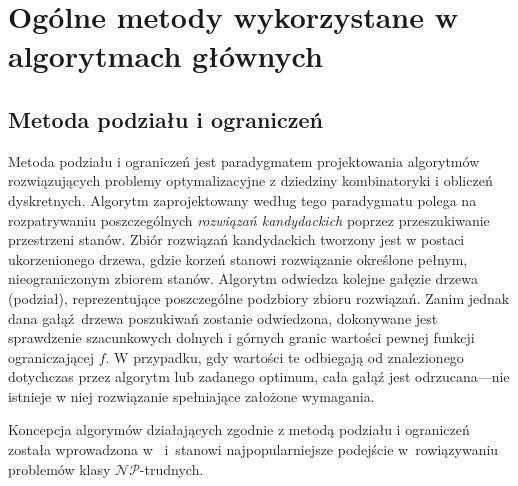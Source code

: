 \section{Ogólne metody wykorzystane w algorytmach głównych}\label{s_methods}

\subsection{Metoda podziału i ograniczeń}\label{ss_branch_and_bound}
\par{
  Metoda podziału i ograniczeń jest paradygmatem projektowania algorytmów
  rozwiązujących problemy optymalizacyjne z dziedziny kombinatoryki i obliczeń
  dyskretnych. 
  Algorytm zaprojektowany według tego paradygmatu polega na rozpatrywaniu
  poszczególnych \emph{rozwiązań kandydackich} poprzez przeszukiwanie
  przestrzeni stanów.
  Zbiór rozwiązań kandydackich tworzony jest w postaci ukorzenionego drzewa,
  gdzie korzeń stanowi rozwiązanie określone pełnym, nieograniczonym zbiorem
  stanów.
  Algorytm odwiedza kolejne gałęzie drzewa (podział), reprezentujące poszczególne
  podzbiory zbioru rozwiązań.
  Zanim jednak dana gałąź drzewa poszukiwań zostanie odwiedzona, dokonywane jest
  sprawdzenie szacunkowych dolnych i górnych granic wartości pewnej funkcji 
  ograniczającej $f$.
  W przypadku, gdy wartości te odbiegają od znalezionego dotychczas przez
  algorytm lub zadanego optimum, cała gałąź jest odrzucana---nie istnieje w
  niej rozwiązanie spełniające założone wymagania. 
}
\par{
  Koncepcja algorymów działających zgodnie z metodą podziału i ograniczeń
  została wprowadzona w~\cite{land60} i~stanowi najpopularniejsze podejście
  w~rowiązywaniu problemów klasy $\mathcal{NP}$-trudnych.
}

